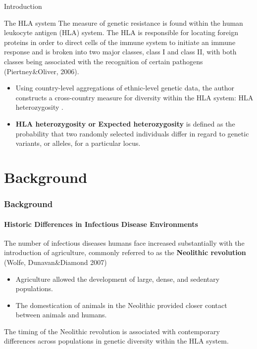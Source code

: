 \documentclass[pdftex,12pt,xcolor=pdftex,table]{beamer}
\theoremstyle{definition}
\theoremstyle{remark}
\numberwithin{equation}{section}
\numberwithin{figure}{section}
\begin{document}
\begin{frame}{Introduction}
\begin{block}{The HLA system}
\justifying
The measure of genetic resistance is  found within the human leukocyte antigen (HLA) system. The HLA is responsible for locating foreign proteins in order to direct cells of the immune system to initiate an immune response and is broken into two major classes, class I and class II, with both classes being associated with the recognition of certain pathogens (Piertney\&Oliver, 2006)\cite{piertney2006evolutionary}.
\pause
\end{block}

\begin{itemize}
    \item
Using country-level aggregations of ethnic-level genetic data, the author constructs a cross-country measure for diversity within the HLA system: HLA heterozygosity .
\end{itemize}
\pause
\begin{itemize}
    \item \textbf{HLA heterozygosity or  Expected heterozygosity} is defined as the probability that two randomly selected individuals differ in regard to genetic variants, or alleles, for a particular locus. 

\end{itemize}

\end{frame}
\section{Background}
\begin{frame}
\frametitle{Background}
\framesubtitle{Historic Differences in Infectious Disease Environments}
\justifying
The number of infectious diseases humans face increased substantially with the introduction of agriculture, commonly referred to as the \textbf{Neolithic revolution} (Wolfe, Dunavan\&Diamond 2007)\cite{wolfe2007origins}
\pause
\begin{itemize}
    \item Agriculture allowed the development of large, dense, and sedentary populations.
    \pause
    \item The domestication of animals in the Neolithic provided closer contact between animals and humans.
    \pause
\end{itemize}
The timing of the Neolithic revolution is associated with contemporary differences across populations in genetic diversity within the HLA system.
\end{frame}
\end{document}
